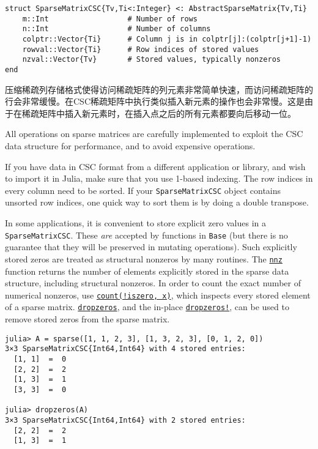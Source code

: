 \begin{verbatim}
struct SparseMatrixCSC{Tv,Ti<:Integer} <: AbstractSparseMatrix{Tv,Ti}
    m::Int                  # Number of rows
    n::Int                  # Number of columns
    colptr::Vector{Ti}      # Column j is in colptr[j]:(colptr[j+1]-1)
    rowval::Vector{Ti}      # Row indices of stored values
    nzval::Vector{Tv}       # Stored values, typically nonzeros
end
\end{verbatim}



压缩稀疏列存储格式使得访问稀疏矩阵的列元素非常简单快速，而访问稀疏矩阵的行会非常缓慢。在CSC稀疏矩阵中执行类似插入新元素的操作也会非常慢。这是由于在稀疏矩阵中插入新元素时，在插入点之后的所有元素都要向后移动一位。



All operations on sparse matrices are carefully implemented to exploit the CSC data structure for performance, and to avoid expensive operations.



If you have data in CSC format from a different application or library, and wish to import it in Julia, make sure that you use 1-based indexing. The row indices in every column need to be sorted. If your \texttt{SparseMatrixCSC} object contains unsorted row indices, one quick way to sort them is by doing a double transpose.



In some applications, it is convenient to store explicit zero values in a \texttt{SparseMatrixCSC}. These \emph{are} accepted by functions in \texttt{Base} (but there is no guarantee that they will be preserved in mutating operations). Such explicitly stored zeros are treated as structural nonzeros by many routines. The \hyperlink{4231069364201374387}{\texttt{nnz}} function returns the number of elements explicitly stored in the sparse data structure, including structural nonzeros. In order to count the exact number of numerical nonzeros, use \hyperlink{4123799324867706690}{\texttt{count(!iszero, x)}}, which inspects every stored element of a sparse matrix. \hyperlink{10222793754853330762}{\texttt{dropzeros}}, and the in-place \hyperlink{13132808383029320263}{\texttt{dropzeros!}}, can be used to remove stored zeros from the sparse matrix.




\begin{verbatim}
julia> A = sparse([1, 1, 2, 3], [1, 3, 2, 3], [0, 1, 2, 0])
3×3 SparseMatrixCSC{Int64,Int64} with 4 stored entries:
  [1, 1]  =  0
  [2, 2]  =  2
  [1, 3]  =  1
  [3, 3]  =  0

julia> dropzeros(A)
3×3 SparseMatrixCSC{Int64,Int64} with 2 stored entries:
  [2, 2]  =  2
  [1, 3]  =  1
\end{verbatim}



